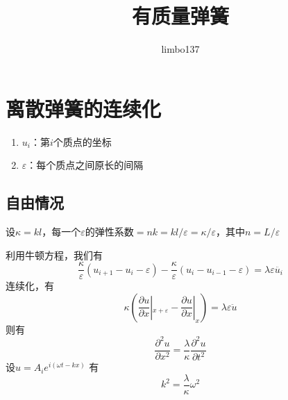\documentclass[hyperref,UTF8]{ctexart}
\title{有质量弹簧}
\author{limbo137}
\begin{document}
\maketitle
\section{离散弹簧的连续化}
\begin{enumerate}
    \item \(u_i\)：第\(i\)个质点的坐标
    \item \(\varepsilon\)：每个质点之间原长的间隔
\end{enumerate}
\subsection{自由情况}
设$\kappa = kl$，每一个\(\varepsilon\)的弹性系数$=nk=kl/\varepsilon=\kappa/\varepsilon$，其中\(n=L/\varepsilon\)

利用牛顿方程，我们有
\[\frac{\kappa}{\varepsilon}(u_{i+1}-u_{i}-\varepsilon)-\frac{\kappa}{\varepsilon}(u_i-u_{i-1}-\varepsilon)=\lambda\varepsilon\ddot{u_i}\]
连续化，有
\[\kappa(\frac{\partial u}{\partial x}|_{x+\varepsilon}-\frac{\partial u}{\partial x}|_{x})=\lambda\varepsilon\ddot{u}\]
则有
\[\frac{\partial^2 u}{\partial x^2}=\frac{\lambda}{\kappa}\frac{\partial^2 u}{\partial t^2}\]
设\(u=A_i e^{i(\omega t-kx)}\)
有\[k^2=\frac{\lambda}{\kappa }\omega^2\]
\end{document}
